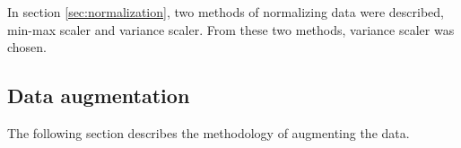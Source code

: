In section \ref{sec:normalization}, two methods of normalizing data were described, min-max scaler and variance scaler. From these two methods, variance scaler was chosen.

\subsection{Data augmentation}
The following section describes the methodology of augmenting the data.



